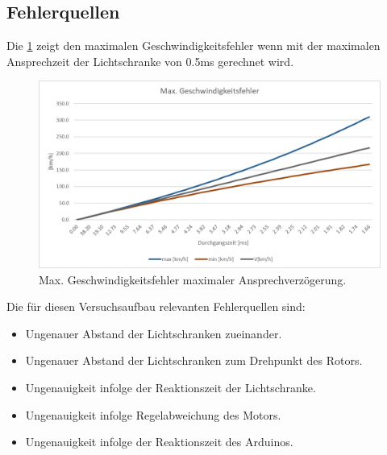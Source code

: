 \clearpage
\subsection{Fehlerquellen}
Die \ref{fig:AuswertungZeitfehler} zeigt den maximalen Geschwindigkeitsfehler wenn mit der maximalen Ansprechzeit der Lichtschranke von 0.5ms gerechnet wird.
\begin{figure}[ht]
    \centering
    \includegraphics[width=\textwidth]{images/Zeitfehler.png}
    \caption{Max. Geschwindigkeitsfehler maximaler Ansprechverzögerung.}
    \label{fig:AuswertungZeitfehler}
\end{figure}

Die für diesen Versuchsaufbau relevanten Fehlerquellen sind:
\begin{itemize}
    \item Ungenauer Abstand der Lichtschranken zueinander.
    \item Ungenauer Abstand der Lichtschranken zum Drehpunkt des Rotors.
    \item Ungenauigkeit infolge der Reaktionszeit der Lichtschranke.
    \item Ungenauigkeit infolge Regelabweichung des Motors.
    \item Ungenauigkeit infolge der Reaktionszeit des Arduinos.
\end{itemize}
